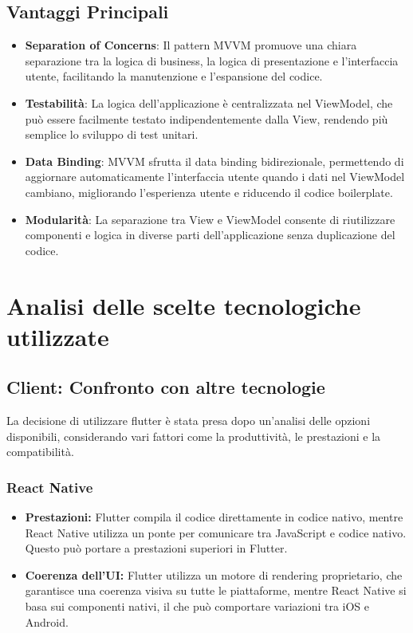 \subsection*{Vantaggi Principali}
\begin{itemize}
    \item \textbf{Separation of Concerns}: Il pattern MVVM promuove una chiara separazione tra la logica di business, la logica di presentazione e l'interfaccia utente, facilitando la manutenzione e l'espansione del codice.
    
    \item \textbf{Testabilità}: La logica dell'applicazione è centralizzata nel ViewModel, che può essere facilmente testato indipendentemente dalla View, rendendo più semplice lo sviluppo di test unitari.
    
    \item \textbf{Data Binding}: MVVM sfrutta il data binding bidirezionale, permettendo di aggiornare automaticamente l'interfaccia utente quando i dati nel ViewModel cambiano, migliorando l'esperienza utente e riducendo il codice boilerplate.
    
    \item \textbf{Modularità}: La separazione tra View e ViewModel consente di riutilizzare componenti e logica in diverse parti dell'applicazione senza duplicazione del codice.
\end{itemize}


\section{Analisi delle scelte tecnologiche utilizzate}
\subsection{Client: Confronto con altre tecnologie}
La decisione di utilizzare flutter è stata presa dopo un'analisi delle opzioni disponibili, considerando vari fattori come la produttività, le prestazioni e la compatibilità.

\subsubsection{React Native}
\begin{itemize}
	\item \textbf{Prestazioni:} Flutter compila il codice direttamente in codice nativo, mentre React Native utilizza un ponte per comunicare tra JavaScript e codice nativo. Questo può portare a prestazioni superiori in Flutter.
	\item \textbf{Coerenza dell'UI:} Flutter utilizza un motore di rendering proprietario, che garantisce una coerenza visiva su tutte le piattaforme, mentre React Native si basa sui componenti nativi, il che può comportare variazioni tra iOS e Android.
\end{itemize}

